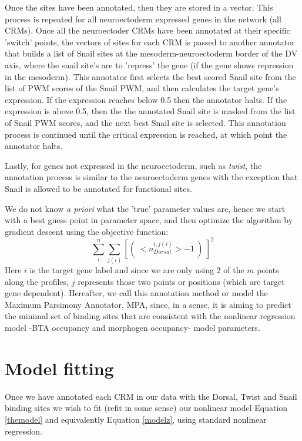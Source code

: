   Once the sites have been annotated, then they are stored in a vector.  This process is repeated for all neuroectoderm expressed genes in the network (all CRMs).  Once all the neuroectoder CRMs have been annotated at their specific 'switch' points, the vectors of sites for each CRM is passed to another annotator that builds a list of Snail sites at the mesoderm-neuroectoderm border of the DV axis, where the snail site's are to 'repress' the gene (if the gene shows repression in the mesoderm).  This annotator first selects the best scored Snail site from the list of PWM scores of the Snail PWM, and then calculates the target gene's expression.  If the expression reaches below 0.5 then the annotator halts.  If the expression is above 0.5, then the the annotated Snail site is masked from the list of Snail PWM scores, and the next best Snail site is selected.  This annotation process is continued until the critical expression is reached, at which point the annotator halts.
  
  Lastly, for genes not expressed in the neuroectoderm, such as \textit{twist}, the annotation process is similar to the neuroectoderm genes with the exception that Snail is allowed to be annotated for functional sites. 
  
  We do not know \textit{a priori} what the 'true' parameter values are, hence we start with a best guess point in parameter space, and then optimize the algorithm by gradient descent using the objective function:
\begin{equation}\label{MPAobj}
   \sum_i^n \sum_{j(i)} [ ( \ <n_{Dorsal}^{i,j(i)}> - 1\ ) \ ]^2 
\end{equation}
Here $i$ is the target gene label and since we are only using 2 of the $m$ points along the profiles, $j$ represents those two points or positions (which are target gene dependent).  Hereafter, we call this annotation method or model the Maximum Parsimony Annotator, MPA, since, in a sense, it is aiming to predict the minimal set of binding sites that are consistent with the nonlinear regression model -BTA occupancy and morphogen occupancy- model parameters.
 


\section{Model fitting}
Once we have annotated each CRM in our data with the Dorsal, Twist and Snail binding sites we wish to fit (refit in some sense) our nonlinear model Equation \ref{themodel} and equivalently Equation \ref{modelz}, using standard nonlinear regression.

